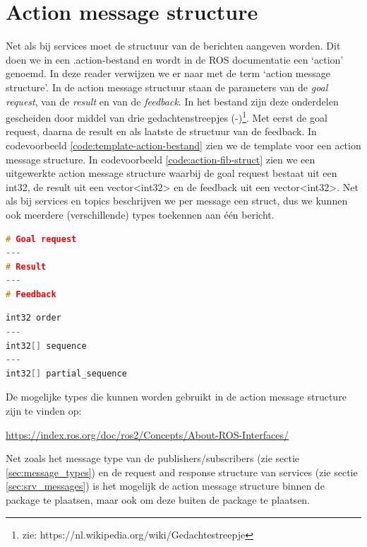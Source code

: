 \section{Action message structure}
\label{sec:action_message_structure}
Net als bij services moet de structuur van de berichten aangeven worden. Dit doen we in een .action-bestand en wordt in de ROS documentatie een `action' genoemd. In deze reader verwijzen we er naar met de term `action message structure'. In de action message structuur staan de parameters van de \textit{goal request}, van de \textit{result} en van de \textit{feedback}. In het bestand zijn deze onderdelen gescheiden door middel van drie gedachtenstreepjes (-)\footnote{zie: https://nl.wikipedia.org/wiki/Gedachtestreepje}. Met eerst de goal request, daarna de result en als laatste de structuur van de feedback. In codevoorbeeld \ref{code:template-action-bestand} zien we de template voor een action message structure. In codevoorbeeld \ref{code:action-fib-struct} zien we een uitgewerkte action message structure waarbij de goal request bestaat uit een int32, de result uit een vector<int32> en de feedback uit een vector<int32>. Net als bij services en topics beschrijven we per message een struct, dus we kunnen ook meerdere (verschillende) types toekennen aan \'e\'en bericht. 

\begin{lstlisting}[language=C++, caption={Template van een .action-bestand}, firstnumber=0, label={code:template-action-bestand}]
# Goal request
---
# Result
---
# Feedback
\end{lstlisting}

\begin{lstlisting}[language=C++, caption={Het .action-bestand voor een fibonacci-action server.}, firstnumber=0, label={code:action-fib-struct}]
int32 order
---
int32[] sequence
---
int32[] partial_sequence
\end{lstlisting}

\noindent De mogelijke types die kunnen worden gebruikt in de action message structure zijn te vinden op:
\begin{center}
    \url{https://index.ros.org/doc/ros2/Concepts/About-ROS-Interfaces/}
\end{center}

\noindent Net zoals het message type van de publishers/subscribers (zie sectie \ref{sec:message_types}) en de request and response structure van services (zie sectie \ref{sec:srv_messages}) is het mogelijk de action message structure binnen de package te plaatsen, maar ook om deze buiten de package te plaatsen. 

